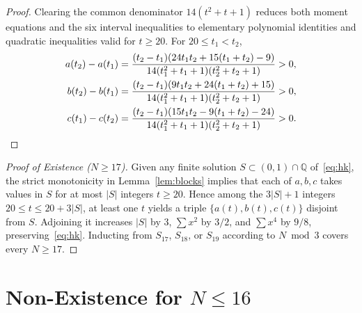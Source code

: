 \documentclass[11pt]{article}
\begin{document}
\begin{proof}
Clearing the common denominator $14(t^2 + t + 1)$ reduces both moment equations
and the six interval inequalities to elementary polynomial identities and
quadratic inequalities valid for $t \ge 20$. For $20 \le t_1 < t_2$,
\begin{align*}
a(t_2) - a(t_1) &= \frac{(t_2 - t_1)(24 t_1 t_2 + 15(t_1 + t_2) - 9)}{14(t_1^2+t_1+1)(t_2^2+t_2+1)} > 0, \\
b(t_2) - b(t_1) &= \frac{(t_2 - t_1)(9 t_1 t_2 + 24(t_1 + t_2) + 15)}{14(t_1^2+t_1+1)(t_2^2+t_2+1)} > 0, \\
c(t_1) - c(t_2) &= \frac{(t_2 - t_1)(15 t_1 t_2 - 9(t_1 + t_2) - 24)}{14(t_1^2+t_1+1)(t_2^2+t_2+1)} > 0. \qedhere
\end{align*}
\end{proof}

\begin{proof}[Proof of Existence ($N \ge 17$)]
Given any finite solution $S \subset (0, 1) \cap \mathbb{Q}$ of~\eqref{eq:hk},
the strict monotonicity in Lemma~\ref{lem:blocks} implies that each of
$a, b, c$ takes values in $S$ for at most $|S|$ integers $t \ge 20$. Hence among
the $3|S| + 1$ integers $20 \le t \le 20 + 3|S|$, at least one $t$ yields a
triple $\{a(t), b(t), c(t)\}$ disjoint from $S$. Adjoining it increases $|S|$ by
$3$, $\sum x^2$ by $3/2$, and $\sum x^4$ by $9/8$, preserving~\eqref{eq:hk}.
Inducting from $S_{17}$, $S_{18}$, or $S_{19}$ according to $N \bmod 3$ covers
every $N \ge 17$.
\end{proof}

\section{Non-Existence for $N \le 16$}
\end{document}
